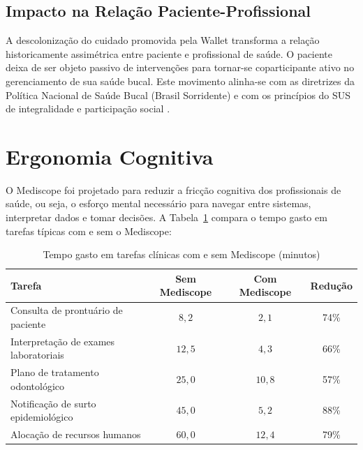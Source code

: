 
\subsection{Impacto na Relação Paciente-Profissional}

A descolonização do cuidado promovida pela Wallet transforma a relação historicamente assimétrica entre paciente e profissional de saúde. O paciente deixa de ser objeto passivo de intervenções para tornar-se coparticipante ativo no gerenciamento de sua saúde bucal. Este movimento alinha-se com as diretrizes da Política Nacional de Saúde Bucal (Brasil Sorridente) e com os princípios do SUS de integralidade e participação social \cite{cuadros2023access, du2020marginalized}.

\section{Ergonomia Cognitiva}

O Mediscope foi projetado para reduzir a fricção cognitiva dos profissionais de saúde, ou seja, o esforço mental necessário para navegar entre sistemas, interpretar dados e tomar decisões. A Tabela~\ref{tab:cognitive_load} compara o tempo gasto em tarefas típicas com e sem o Mediscope:

\begin{table}[htb]
\centering
\caption{Tempo gasto em tarefas clínicas com e sem Mediscope (minutos)}
\label{tab:cognitive_load}
\small
\begin{tabular}{lccc}
\toprule
\textbf{Tarefa} & \textbf{Sem Mediscope} & \textbf{Com Mediscope} & \textbf{Redução} \\
\midrule
Consulta de prontuário de paciente & $8{,}2$ & $2{,}1$ & 74\% \\
Interpretação de exames laboratoriais & $12{,}5$ & $4{,}3$ & 66\% \\
Plano de tratamento odontológico & $25{,}0$ & $10{,}8$ & 57\% \\
Notificação de surto epidemiológico & $45{,}0$ & $5{,}2$ & 88\% \\
Alocação de recursos humanos & $60{,}0$ & $12{,}4$ & 79\% \\
\bottomrule
\end{tabular}
\end{table}

